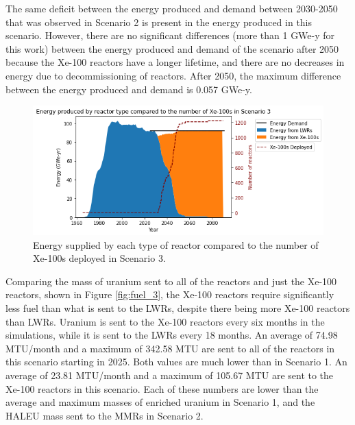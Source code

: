 The same deficit between the energy produced and demand between 
2030-2050 that was observed in Scenario 2 is present in the energy produced 
in this scenario. However, there are no significant 
differences (more than 1 GWe-y for this work) between the energy 
produced and demand of the scenario 
after 2050 because the Xe-100 reactors have a longer lifetime, and there are 
no decreases in energy due to decommissioning of reactors. After 2050, the 
maximum difference between the energy produced and demand is 0.057 GWe-y. 

\begin{figure}
    \centering 
    \includegraphics[width=\textwidth]{../figures/energy_scenario3.png}
    \caption{Energy supplied by each type of reactor compared to the number of 
    Xe-100s deployed in Scenario 3.}
    \label{fig:energy_rx_3}
\end{figure}

Comparing the mass of uranium sent to all of the reactors and just the Xe-100 
reactors, shown in Figure \ref{fig:fuel_3}, the Xe-100 reactors 
require significantly less fuel than what is sent to the \glspl{LWR}, 
despite there being more Xe-100 reactors than \glspl{LWR}. Uranium 
is sent to the Xe-100 reactors every six months in the simulations, 
while it is sent to the \glspl{LWR} every 18 months. An average of 
74.98 MTU/month and a maximum of 342.58 MTU are sent to all of the reactors 
in this scenario starting in 2025. Both values are much
lower than in Scenario 1. An average of 23.81 
MTU/month and a maximum of 105.67 MTU are sent to the Xe-100 reactors in 
this scenario. Each of these numbers are lower than the 
average and maximum masses of enriched uranium  
in Scenario 1, and the \gls{HALEU} mass sent to the \glspl{MMR} in 
Scenario 2. 

